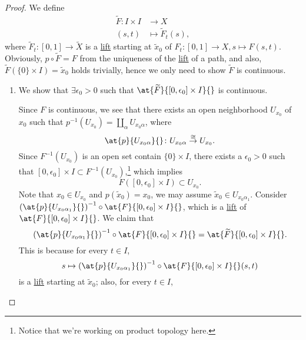 \begin{proof}
	We define
	\[
		\begin{split}
			\widetilde{F} \colon I\times I & \to X                           \\
			(s, t)                         & \mapsto \widetilde{F} _{t} (s),
		\end{split}
	\]
	where \(\widetilde{F} _{t} \colon [0, 1]\to \widetilde{X}\) is a \hyperref[def:lift]{lift} starting at \(\widetilde{x} _0\) of \(F_{t} \colon [0, 1]\to X, s\mapsto F(s, t)\).
	Obviously, \(p\circ \widetilde{F} = F\) from the uniqueness of the \hyperref[def:lift]{lift} of a path, and also, \(\widetilde{F} (\{0\}\times I) = \widetilde{x} _0\)
	holds trivially, hence we only need to show \(\widetilde{F} \) is continuous.
	\begin{enumerate}[(1)]
		\item We show that \(\exists \epsilon _0>0\) such that \(\at{\widetilde{F} }{[0, \epsilon _0]\times I}{} \) is continuous.
		      \begin{figure}[H]
			      \centering
			      \label{fig:pf:col:lec14-5}
		      \end{figure}
		      Since \(F\) is continuous, we see that there exists an open neighborhood \(U_{x_0}\) of \(x_0\) such that \(p^{-1} (U_{x_0})= \coprod_\alpha U_{x_0 \alpha } \), where
		      \[
			      \at{p}{U_{x_0 \alpha }}{} \colon U_{x_0 \alpha }\overset{\cong }{\to } U_{x_0}.
		      \]
		      Since \(F^{-1} (U_{x_0})\) is an open set contain \(\{0\}\times I\), there exists a \(\epsilon _0>0\) such that \([0, \epsilon _0]\times I\subset F^{-1} (U_{x_0})\),\footnote{Notice that we're working on product topology here.}
		      which implies
		      \[
			      F\left([0, \epsilon _0]\times I\right)\subset U_{x_0}.
		      \]
		      Note that \(x_0\in U_{x_0}\) and \(p(\widetilde{x} _0) = x_0\), we may assume \(\widetilde{x} _0\in U_{x_0 \alpha _1}\). Consider \(\left(\at{p}{U_{x_0 \alpha _1}}{} \right)^{-1} \circ \at{F}{[0, \epsilon _0]\times I}{} \),
		      which is a \hyperref[def:lift]{lift} of \(\at{F}{[0, \epsilon _0]\times I}{} \). We claim that
		      \[
			      \left(\at{p}{U_{x_0 \alpha _1}}{} \right)^{-1} \circ \at{F}{[0, \epsilon _0]\times I}{} = \at{\widetilde{F} }{[0, \epsilon _0]\times I}{}.
		      \]
		      This is because for every \(t\in I\),
		      \[
			      s\mapsto \left(\at{p}{U_{x_0 \alpha _1}}{} \right)^{-1} \circ \at{F}{[0, \epsilon _0]\times I}{}(s, t)
		      \]
		      is a \hyperref[def:lift]{lift} starting at \(\widetilde{x} _0\); also, for every \(t\in I\),
		      \[
\]
\end{enumerate}
\end{proof}
